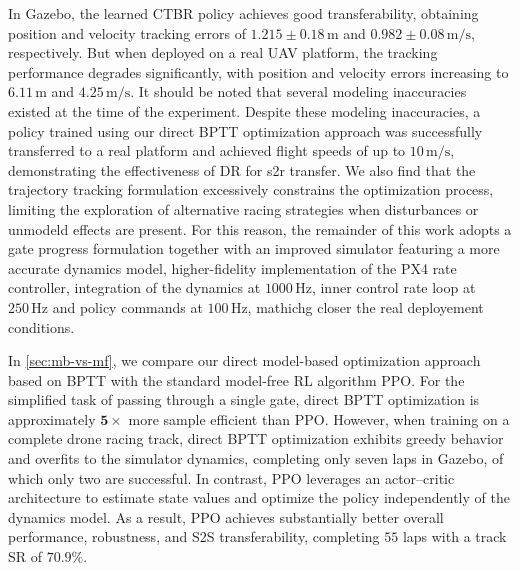 In Gazebo, the learned \ac{CTBR} policy achieves good transferability, obtaining position and velocity tracking errors of $1.215 \pm 0.18\, \mathrm{m}$ and $0.982 \pm 0.08\, \mathrm{m/s}$, respectively.
But when deployed on a real UAV platform, the tracking performance degrades significantly, with position and velocity errors increasing to $6.11\, \mathrm{m}$ and $4.25\, \mathrm{m/s}$.
It should be noted that several modeling inaccuracies existed at the time of the experiment.
Despite these modeling inaccuracies, a policy trained using our direct \ac{BPTT} optimization approach was successfully transferred to a real platform and achieved flight speeds of up to $10\, \mathrm{m/s}$, demonstrating the effectiveness of \ac{DR} for \ac{s2r} transfer.
We also find that the trajectory tracking formulation excessively constrains the optimization process, limiting the exploration of alternative racing strategies when disturbances or unmodeld effects are present.
For this reason, the remainder of this work adopts a gate progress formulation together with an improved simulator featuring a more accurate dynamics model, higher-fidelity implementation of the PX4 rate controller, integration of the dynamics at $1000\, \mathrm{Hz}$, inner control rate loop at $250\, \mathrm{Hz}$ and policy commands at $100\, \mathrm{Hz}$, mathichg closer the real deployement conditions.




In \autoref{sec:mb-vs-mf}, we compare our direct model-based optimization approach based on \ac{BPTT} with the standard model-free \ac{RL} algorithm \ac{PPO}.
For the simplified task of passing through a single gate, direct \ac{BPTT} optimization is approximately $\mathbf{5\times}$ more sample efficient than \ac{PPO}.
However, when training on a complete drone racing track, direct \ac{BPTT} optimization exhibits greedy behavior and overfits to the simulator dynamics, completing only seven laps in Gazebo, of which only two are successful.
In contrast, \ac{PPO} leverages an actor--critic architecture to estimate state values and optimize the policy independently of the dynamics model.
As a result, \ac{PPO} achieves substantially better overall performance, robustness, and \ac{S2S} transferability, completing $55$ laps with a track \ac{SR} of $\mathbf{70.9\%}$.

